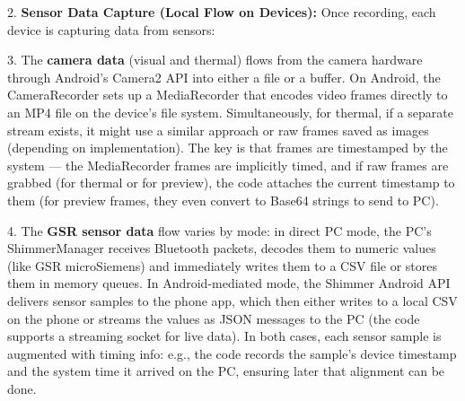 2.  \textbf{Sensor Data Capture (Local Flow on Devices):} Once recording,
    each device is capturing data from sensors:

3.  The \textbf{camera data} (visual and thermal) flows from the camera
    hardware through Android's Camera2 API into either a file or a
    buffer. On Android, the CameraRecorder sets up a MediaRecorder that
    encodes video frames directly to an MP4 file on the device's file
    system\cite{WebcamCapture}\cite{WebcamCapture}.
    Simultaneously, for thermal, if a separate stream exists, it might
    use a similar approach or raw frames saved as images (depending on
    implementation). The key is that frames are timestamped by the
    system --- the MediaRecorder frames are implicitly timed, and if raw
    frames are grabbed (for thermal or for preview), the code attaches
    the current timestamp to them (for preview frames, they even convert
    to Base64 strings to send to PC).

4.  The \textbf{GSR sensor data} flow varies by mode: in direct PC mode, the
    PC's ShimmerManager receives Bluetooth packets, decodes them to
    numeric values (like GSR microSiemens) and immediately writes them
    to a CSV file or stores them in memory
    queues\cite{ShimmerManager}\cite{CortisolStressIndicator2020}.
    In Android-mediated mode, the Shimmer Android API delivers sensor
    samples to the phone app, which then either writes to a local CSV on
    the phone or streams the values as JSON messages to the PC (the code
    supports a streaming socket for live
    data\cite{ShimmerRecorder}\cite{ShimmerRecorder}).
    In both cases, each sensor sample is augmented with timing info:
    e.g., the code records the sample's device timestamp and the system
    time it arrived on the
    PC\cite{CortisolStressIndicator2020},
    ensuring later that alignment can be done.

